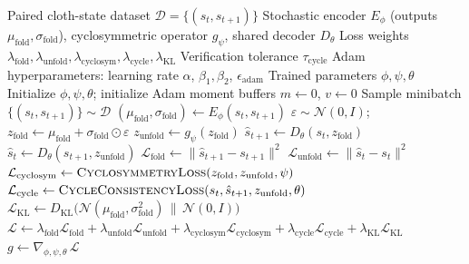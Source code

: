 \documentclass[11pt]{article}
\begin{document}
\begin{algorithm}[H]
\caption{Bidirectional Latent Action Model --- Stage 1 Training (Consolidated)}
\label{alg:blam-stage1-final}
\begin{algorithmic}[1]
\Require Paired cloth-state dataset $\mathcal{D} = \{(s_t, s_{t+1})\}$
\Require Stochastic encoder $E_\phi$ (outputs $\mu_{\text{fold}}, \sigma_{\text{fold}}$), cyclosymmetric operator $g_\psi$, shared decoder $D_\theta$
\Require Loss weights $\lambda_{\text{fold}}, \lambda_{\text{unfold}}, \lambda_{\text{cyclosym}}, \lambda_{\text{cycle}}, \lambda_{\text{KL}}$
\Require Verification tolerance $\tau_{\text{cycle}}$
\Require Adam hyperparameters: learning rate $\alpha$, $\beta_1, \beta_2$, $\epsilon_{\text{adam}}$
\Ensure Trained parameters $\phi, \psi, \theta$
\State Initialize $\phi, \psi, \theta$; initialize Adam moment buffers $m \gets 0$, $v \gets 0$
    \State Sample minibatch $\{(s_t, s_{t+1})\} \sim \mathcal{D}$
    \State $(\mu_{\text{fold}}, \sigma_{\text{fold}}) \gets E_\phi(s_t, s_{t+1})$ 
    \State $\varepsilon \sim \mathcal{N}(0, I)$; \quad $z_{\text{fold}} \gets \mu_{\text{fold}} + \sigma_{\text{fold}} \odot \varepsilon$ 
    \State $z_{\text{unfold}} \gets g_\psi(z_{\text{fold}})$ 
    \State $\hat{s}_{t+1} \gets D_\theta(s_t, z_{\text{fold}})$ 
    \State $\hat{s}_t \gets D_\theta(s_{t+1}, z_{\text{unfold}})$ 
    \State $\mathcal{L}_{\text{fold}} \gets \lVert \hat{s}_{t+1} - s_{t+1} \rVert^2$
    \State $\mathcal{L}_{\text{unfold}} \gets \lVert \hat{s}_t - s_t \rVert^2$
    \State $\mathcal{L}_{\text{cyclosym}} \gets \textsc{CyclosymmetryLoss}(z_{\text{fold}}, z_{\text{unfold}}, \psi)$ 
    \State $\mathcal{L}_{\text{cycle}} \gets \textsc{CycleConsistencyLoss}(s_t, \hat{s}_{t+1}, z_{\text{unfold}}, \theta)$ 
    \State $\mathcal{L}_{\text{KL}} \gets D_{\text{KL}}\big(\mathcal{N}(\mu_{\text{fold}}, \sigma_{\text{fold}}^2) \,\|\, \mathcal{N}(0, I)\big)$
    \State $\mathcal{L} \gets \lambda_{\text{fold}}\mathcal{L}_{\text{fold}} + \lambda_{\text{unfold}}\mathcal{L}_{\text{unfold}} + \lambda_{\text{cyclosym}}\mathcal{L}_{\text{cyclosym}} + \lambda_{\text{cycle}}\mathcal{L}_{\text{cycle}} + \lambda_{\text{KL}}\mathcal{L}_{\text{KL}}$
    \State $g \gets \nabla_{\phi,\psi,\theta}\,\mathcal{L}$

\end{algorithmic}
\end{algorithm}
\end{document}
